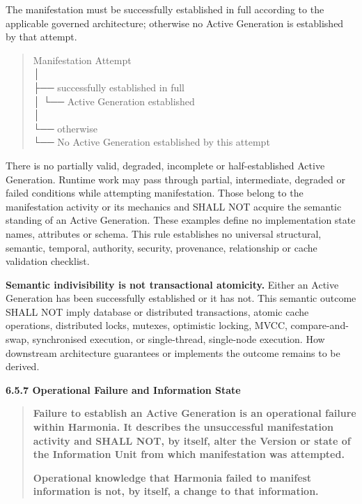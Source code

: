 The manifestation must be successfully established in full according to the
applicable governed architecture; otherwise no Active Generation is established
by that attempt.



\begin{quote}\small\ttfamily
Manifestation Attempt\\
      │\\
      ├── successfully established in full\\
      │           └── Active Generation established\\
      │\\
      └── otherwise\\
                  └── No Active Generation established by this attempt\\

\end{quote}


There is no partially valid, degraded, incomplete or half-established Active
Generation. Runtime work may pass through partial, intermediate, degraded or
failed conditions while attempting manifestation. Those belong to the
manifestation activity or its mechanics and SHALL NOT acquire the semantic
standing of an Active Generation. These examples define no implementation state
names, attributes or schema. This rule establishes no universal structural,
semantic, temporal, authority, security, provenance, relationship or cache
validation checklist.



\textbf{Semantic indivisibility is not transactional atomicity.} Either an Active
Generation has been successfully established or it has not. This semantic outcome
SHALL NOT imply database or distributed transactions, atomic cache operations,
distributed locks, mutexes, optimistic locking, MVCC, compare-and-swap,
synchronised execution, or single-thread, single-node execution. How downstream
architecture guarantees or implements the outcome remains to be derived.



\par\medskip\textbf{6.5.7 Operational Failure and Information State}\par


\begin{quote}


\textbf{Failure to establish an Active Generation is an operational failure within Harmonia. It describes the unsuccessful manifestation activity and SHALL NOT, by itself, alter the Version or state of the Information Unit from which manifestation was attempted.}



\textbf{Operational knowledge that Harmonia failed to manifest information is not, by itself, a change to that information.}



\end{quote}



